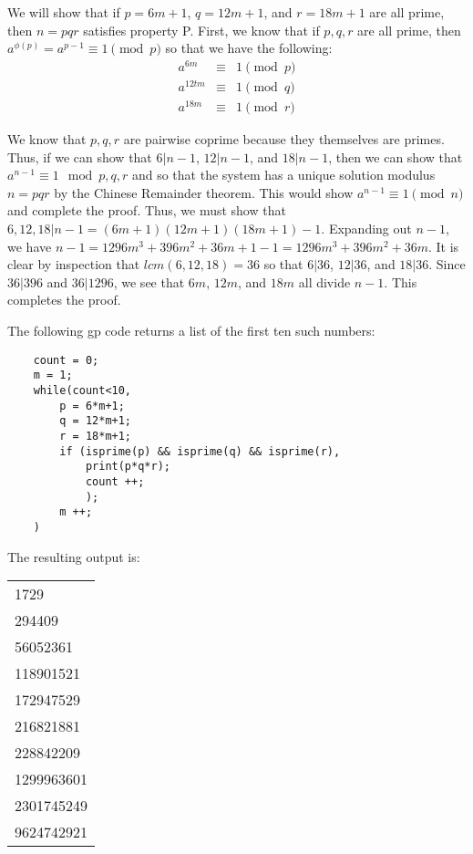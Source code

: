 \documentclass[psamsfonts]{amsart}
\newenvironment{sol}{{\bfseries Solution}}{\qedsymbol}
\theoremstyle{definition}
\theoremstyle{remark}
\numberwithin{equation}{section}
\begin{document}
\begin{sol}
We will show that if $p = 6m + 1$, $q = 12m + 1$, and $r = 18m + 1$ are all prime, then $n=pqr$ satisfies property P. First, we know that if $p,q,r$ are all prime, then $a^{\phi(p)} = a^{p - 1} \equiv 1 \pmod{p}$ so that we have the following:
\begin{eqnarray}
a^{6m} &\equiv& 1 \pmod{p} \\
a^{12tm} &\equiv& 1 \pmod{q} \\
a^{18m} &\equiv& 1 \pmod{r} 
\end{eqnarray}

We know that $p,q,r$ are pairwise coprime because they themselves are primes. Thus, if we can show that $6 | n - 1$, $12|n - 1$, and $18 |n - 1$, then we can show that $a^{n - 1} \equiv 1 \mod{p,q,r}$ and so that the system has a unique solution modulus $n=pqr$ by the Chinese Remainder theorem. This would show $a^{n-1} \equiv 1 \pmod{n}$ and complete the proof. Thus, we must show that $6, 12, 18 | n - 1 = (6m + 1)(12m + 1)(18m + 1) - 1$. Expanding out $n - 1$, we have $n - 1 = 1296 m^3 + 396 m^2 + 36m + 1 - 1 = 1296 m^3 + 396 m^2 + 36m$.  It is clear by inspection that $lcm(6,12,18) = 36$ so that $6|36$, $12|36$, and $18|36$. Since $36 | 396$ and $36 | 1296$, we see that $6m$, $12m$, and $18m$ all divide $n-1$. This completes the proof.  

The following gp code returns a list of the first ten such numbers:
\begin{verbatim}
    count = 0;
    m = 1;
    while(count<10,
        p = 6*m+1;
        q = 12*m+1;
        r = 18*m+1;
        if (isprime(p) && isprime(q) && isprime(r), 
            print(p*q*r);
            count ++;
            );
        m ++;
    )
\end{verbatim}

The resulting output is:
\begin{center}
\begin{tabular}{l}
1729 \\
294409 \\
56052361 \\
118901521 \\
172947529 \\
216821881 \\
228842209 \\
1299963601 \\
2301745249 \\
9624742921 
\end{tabular}
\end{center}
\end{sol}
\end{document}
